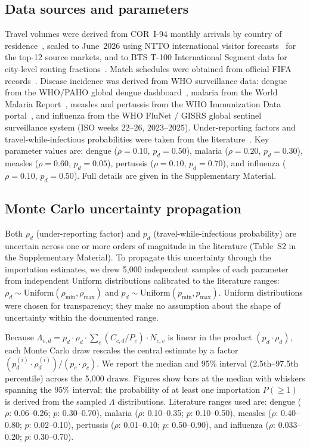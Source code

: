 \documentclass[12pt]{article}
\begin{document}
\subsection*{Data sources and parameters}

Travel volumes were derived from COR~I-94 monthly arrivals by country
of residence~\cite{CBP_I94}, scaled to June~2026 using NTTO
international visitor forecasts~\cite{NTTO2025} for the top-12
source markets, and to BTS T-100 International Segment data for
city-level routing fractions~\cite{BTS_T100}. Match schedules were
obtained from official FIFA records~\cite{FIFA2026_schedule}.
Disease incidence was derived from WHO surveillance data: dengue
from the WHO/PAHO global dengue dashboard~\cite{WHO_dengue},
malaria from the World Malaria Report~\cite{whoWMR2024}, measles
and pertussis from the WHO Immunization Data
portal~\cite{WHO_immunization}, and influenza from the WHO FluNet /
GISRS global sentinel surveillance system (ISO weeks 22--26,
2023--2025). Under-reporting factors and travel-while-infectious
probabilities were taken from the
literature~\cite{bhatt2013,undurraga2013,whoWMR2024,simons2012,mclaughlin2016}.
Key parameter values are: dengue ($\rho=0.10$, $p_d=0.50$), malaria
($\rho=0.20$, $p_d=0.30$), measles ($\rho=0.60$, $p_d=0.05$),
pertussis ($\rho=0.10$, $p_d=0.70$), and influenza ($\rho=0.10$,
$p_d=0.50$). Full details are given in the Supplementary Material.

\subsection*{Monte Carlo uncertainty propagation}

Both $\rho_d$ (under-reporting factor) and $p_d$ (travel-while-infectious probability) are uncertain across one or more orders of magnitude in the literature (Table~S2 in the Supplementary Material). To propagate this uncertainty through the importation estimates, we drew 5,000 independent samples of each parameter from independent Uniform distributions calibrated to the literature ranges: $\rho_d \sim \text{Uniform}(\rho_\text{min}, \rho_\text{max})$ and $p_d \sim \text{Uniform}(p_\text{min}, p_\text{max})$. Uniform distributions were chosen for transparency; they make no assumption about the shape of uncertainty within the documented range.

Because $\Lambda_{v,d} = p_d \cdot \rho_d \cdot \sum_c (C_{c,d}/P_c) \cdot N_{c,v}$ is linear in the product $(p_d \cdot \rho_d)$, each Monte Carlo draw rescales the central estimate by a factor $(p_d^{(i)} \cdot \rho_d^{(i)}) / (p_c \cdot \rho_c)$. We report the median and 95\% interval (2.5th--97.5th percentile) across the 5,000 draws. Figures show bars at the median with whiskers spanning the 95\% interval; the probability of at least one importation $P(\geq 1)$ is derived from the sampled $\Lambda$ distributions. Literature ranges used are: dengue ($\rho$: 0.06--0.26; $p$: 0.30--0.70), malaria ($\rho$: 0.10--0.35; $p$: 0.10--0.50), measles ($\rho$: 0.40--0.80; $p$: 0.02--0.10), pertussis ($\rho$: 0.01--0.10; $p$: 0.50--0.90), and influenza ($\rho$: 0.033--0.20; $p$: 0.30--0.70).
\end{document}
